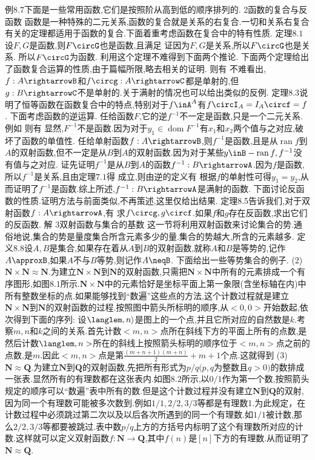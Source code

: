 例$8.7$下面是一些常用函数,它们是按照阶从高到低的顺序排列的.
{2函数的复合与反函数}
函数是一种特殊的二元关系,函数的复合就是关系的右复合.一切和关系右复合有关的定理都适用于函数的复合.下面着重考虑函数在复合中的特有性质.
定理$8.1$设$F,G$是函数,则$F\circG$也是函数,且满足
证因为$F,G$是关系,所以$F\circG$也是关系.
所以$F\circG$为函数.
利用这个定理不难得到下面两个推论.
下面两个定理给出了函数复合运算的性质,由于篇幅所限,略去相关的证明.
则有
不难看出,$f:A\rightarrowB$和$f\circg:A\rightarrowC$都是单射的,但$g:B\rightarrowC$不是单射的.关于满射的情况也可以给出类似的反例.
定理$8.3$说明了恒等函数在函数复合中的特点,特别对于$f\inA^{A}$有$f\circI_{A}=I_{A}\circf=f$.
下面考虑函数的逆运算.
任给函数$F$,它的逆$f^{-1}$不一定是函数,只是一个二元关系.例如
则有
显然,$F^{-1}$不是函数.因为对于$y_{1}\in\operatorname{dom}F^{-1}$有$x_{1}$和$x_{2}$两个值与之对应,破坏了函数的单值性.
任给单射函数$f:A\rightarrowB$,则$f^{-1}$是函数,且是从$\operatorname{ran}f$到$A$的双射函数,但不一定是从$B$到$A$的双射函数.因为对于某些$y\inB-\operatorname{ran}f,f^{-1}$没有值与之对应.
证先证明$f^{-1}$是从$B$到$A$的函数$f^{-1}:B\rightarrowA$.因为$f$是函数,所以$f^{-1}$是关系,且由定理$7.1$得
成立,则由逆的定义有
根据$f$的单射性可得$y_{1}=y_{2}$,从而证明了$f^{-1}$是函数.综上所述,$f^{-1}:B\rightarrowA$是满射的函数.
下面讨论反函数的性质.证明方法与前面类似,不再策述,这里仅给出结果.
定理8.5告诉我们,对于双射函数$f:A\rightarrowA$,有
求$f\circg,g\circf$.如果$f$和$g$存在反函数,求出它们的反函数.
解
{3双射函数与集合的基数}
这一节将利用双射函数来讨论集合的势.通俗地说,集合的势是量度集合所含元素多少的量.集合的势越大,所含的元素越多.
定义$8.8$设$A,B$是集合,如果存在着从$A$到$B$的双射函数,就称$A$和$B$是等势的,记作$A\approxB$,如果$A$不与$B$等势,则记作$A\neqB$.
下面给出一些等势集合的例子.
(2)$\mathbf{N}\times\mathbf{N}\approx\mathbf{N}$.为建立$\mathbf{N}\times\mathbf{N}$到$\mathbf{N}$的双射函数,只需把$\mathbf{N}\times\mathbf{N}$中所有的元素排成一个有序图形,如图$8.1$所示.$\mathbf{N}\times\mathbf{N}$中的元素恰好是坐标平面上第一象限(含坐标轴在内)中所有整数坐标的点.如果能够找到“数遍”这些点的方法,这个计数过程就是建立$\mathbf{N}\times\mathbf{N}$到$\mathbf{N}$的双射函数的过程.按照图中箭头所标明的顺序,从$<0,0>$开始数起,依次得到下面的序列:
设$\langlem,n\rangle$是图上的一个点,并且它所对应的自然数是$k$.考察$m,n$和$k$之间的关系.首先计数$<m,n>$点所在斜线下方的平面上所有的点数,是
然后计数$\langlem,n>$所在的斜线上按照箭头标明的顺序位于$<m,n>$点之前的点数,是$m$.因此$<m,n>$点是第$\frac{(m+n+1)(m+n)}{2}+m+1$个点.这就得到
(3)$\mathbf{N}\approx\mathbf{Q}$.为建立$\mathbf{N}$到$\mathbf{Q}$的双射函数,先把所有形式为$p/q(p,q$为整数且$q>0)$的数排成一张表.显然所有的有理数都在这张表内.如图$8.2$所示,以$0/1$作为第一个数,按照箭头规定的顺序可以“数遍”表中所有的数.但是这个计数过程并没有建立$\mathbf{N}$到$\mathbf{Q}$的双射,因为同一个有理数可能被多次数到.例如$1/1,2/2,3/3$等都是有理数1.为此规定，在计数过程中必须跳过第二次以及以后各次所遇到的同一个有理数.如$1/1$被计数,那么$2/2,3/3$等都要被跳过.表中数$p/q$上方的方括号内标明了这个有理数所对应的计数.这样就可以定义双射函数$f:\mathbf{N}\rightarrow\mathbf{Q}$,其中$f(n)$是$[n]$下方的有理数.从而证明了$\mathbf{N}\approx\mathbf{Q}$.
